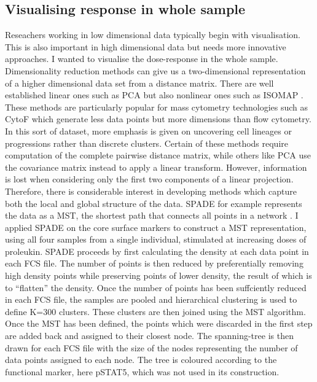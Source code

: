 \subsection{Visualising response in whole sample}

Reseachers working in low dimensional data typically begin with visualisation.
This is also important in high dimensional data but needs more innovative approaches.
I wanted to visualise the dose-response in the whole sample.
Dimensionality reduction methods can give us a two-dimensional representation of a higher dimensional data set from a distance matrix.
There are well established linear ones such as \gls{PCA} but also nonlinear ones such as \gls{ISOMAP} \citep{Tenenbaum:2000jp}.
These methods are particularly popular for mass cytometry technologies such as CytoF which generate less data points but more dimensions than flow cytometry.
In this sort of dataset, more emphasis is given on uncovering cell lineages or progressions rather than discrete clusters.
Certain of these methods require computation of the complete pairwise distance matrix,
while others like PCA use the covariance matrix instead to apply a linear transform.
However, information is lost when considering only the first two components of a linear projection.
Therefore, there is considerable interest in developing methods which capture both the local and global structure of the data.
\acrfull{SPADE} for example represents the data as a \gls{MST}, the shortest path that connects all points in a network \citep{Simonds:2011jh}.
I applied \gls{SPADE} on the core surface markers to construct a \gls{MST} representation, 
using all four samples from a single individual, stimulated at increasing doses of proleukin.
SPADE proceeds by first calculating the density at each data point in each FCS file.
The number of points is then reduced by preferentially removing 
high density points while preserving points of lower density,
the result of which is to ``flatten'' the density.
Once the number of points has been suffciently reduced in each FCS file, the samples are pooled and hierarchical clustering is used 
to define K=300 clusters.  These clusters are then joined using the \gls{MST} algorithm.
Once the MST has been defined, the points which were discarded in the first step are added back and assigned to their closest node.
The spanning-tree is then drawn for each FCS file with the size of the nodes representing the number of data points assigned to each node.
The tree is coloured according to the functional marker, here pSTAT5, which was not used in its construction.

